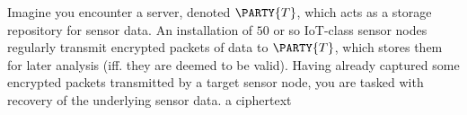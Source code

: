 %



Imagine you encounter a server, denoted 
$\PARTY{T}$, 
which acts as a storage repository for sensor data.  An installation of $50$ 
or so IoT-class sensor nodes regularly transmit encrypted packets of data to
$\PARTY{T}$, 
which stores them for later analysis (iff. they are deemed to be valid).  
Having already captured some encrypted packets transmitted by a target sensor
node, you are tasked with recovery of the underlying sensor data.
{a ciphertext}
